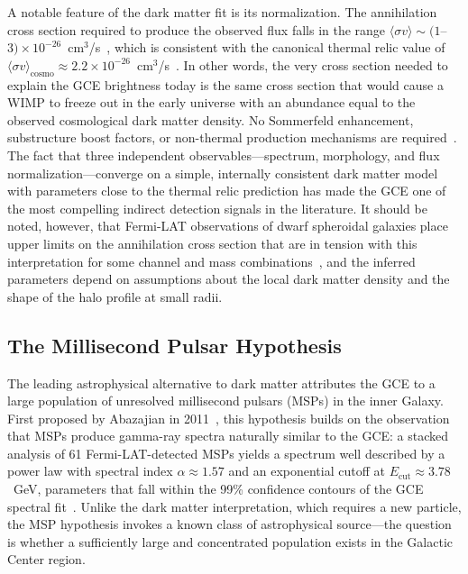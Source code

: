 A notable feature of the dark matter fit is its normalization.
The annihilation cross section required to produce the observed flux falls in the range $\langle \sigma v \rangle \sim (1$--$3) \times 10^{-26}$~cm$^3$/s~\cite{Daylan:2014rsa, Calore:2014xka}, which is consistent with the canonical thermal relic value of $\langle \sigma v \rangle_{\mathrm{cosmo}} \approx 2.2 \times 10^{-26}$~cm$^3$/s~\cite{Cirelli:2024ssz}.
In other words, the very cross section needed to explain the GCE brightness today is the same cross section that would cause a WIMP to freeze out in the early universe with an abundance equal to the observed cosmological dark matter density.
No Sommerfeld enhancement, substructure boost factors, or non-thermal production mechanisms are required~\cite{Daylan:2014rsa}.
The fact that three independent observables---spectrum, morphology, and flux normalization---converge on a simple, internally consistent dark matter model with parameters close to the thermal relic prediction has made the GCE one of the most compelling indirect detection signals in the literature.
It should be noted, however, that Fermi-LAT observations of dwarf spheroidal galaxies place upper limits on the annihilation cross section that are in tension with this interpretation for some channel and mass combinations~\cite{Fermi-LAT:2015att}, and the inferred parameters depend on assumptions about the local dark matter density and the shape of the halo profile at small radii.

\subsection{The Millisecond Pulsar Hypothesis}
\label{sec:4.3.2}

The leading astrophysical alternative to dark matter attributes the GCE to a large population of unresolved millisecond pulsars (MSPs) in the inner Galaxy.
First proposed by Abazajian in 2011~\cite{Abazajian:2010zy}, this hypothesis builds on the observation that MSPs produce gamma-ray spectra naturally similar to the GCE: a stacked analysis of 61 Fermi-LAT-detected MSPs yields a spectrum well described by a power law with spectral index $\alpha \approx 1.57$ and an exponential cutoff at $E_{\mathrm{cut}} \approx 3.78$~GeV, parameters that fall within the 99\% confidence contours of the GCE spectral fit~\cite{Calore:2014xka}.
Unlike the dark matter interpretation, which requires a new particle, the MSP hypothesis invokes a known class of astrophysical source---the question is whether a sufficiently large and concentrated population exists in the Galactic Center region.

